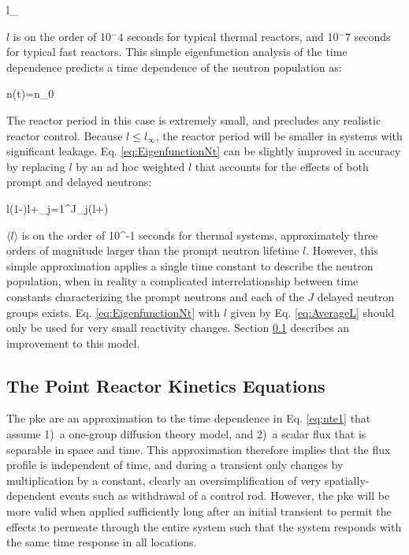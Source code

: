 \beq
l_\infty\equiv{}
\eeq

\(l\) is on the order of 10$^-4$ seconds for typical thermal reactors, and 10$^-7$ seconds for typical fast reactors. This simple eigenfunction analysis of the time dependence predicts a time dependence of the neutron population as:

\beq
\label{eq:EigenfunctionNt}
n(t)=n_0
\eeq

The reactor period in this case is extremely small, and precludes any realistic reactor control. Because \(l\leq l_\infty\), the reactor period will be smaller in systems with significant leakage. Eq. \eqref{eq:EigenfunctionNt} can be slightly improved in accuracy by replacing \(l\) by an ad hoc weighted \(l\) that accounts for the effects of both prompt and delayed neutrons:

\beq
\label{eq:AverageL}
\langle l\rangle\equiv(1-\beta)l+\sum_{j=1}^J\beta_j\left(l+\right)
\eeq

\(\langle l\rangle\) is on the order of 10^{-1} seconds for thermal systems, approximately three orders of magnitude larger than the prompt neutron lifetime \(l\). However, this simple approximation applies a single time constant to describe the neutron population, when in reality a complicated interrelationship between time constants characterizing the prompt neutrons and each of the \(J\) delayed neutron groups exists. Eq. \eqref{eq:EigenfunctionNt} with \(l\) given by Eq. \eqref{eq:AverageL} should only be used for very small reactivity changes. Section \ref{sec:PKE} describes an improvement to this model.

\subsection{The Point Reactor Kinetics Equations}
\label{sec:PKE}

The \gls{pke} are an approximation to the time dependence in Eq. \eqref{eq:nte1} that assume 1)~a one-group diffusion theory model, and 2)~a scalar flux that is separable in space and time. This approximation therefore implies that the flux profile is independent of time, and during a transient only changes by multiplication by a constant, clearly an oversimplification of very spatially-dependent events such as withdrawal of a control rod. However, the \gls{pke} will be more valid when applied sufficiently long after an initial transient to permit the effects to permeate through the entire system such that the system responds with the same time response in all locations.

